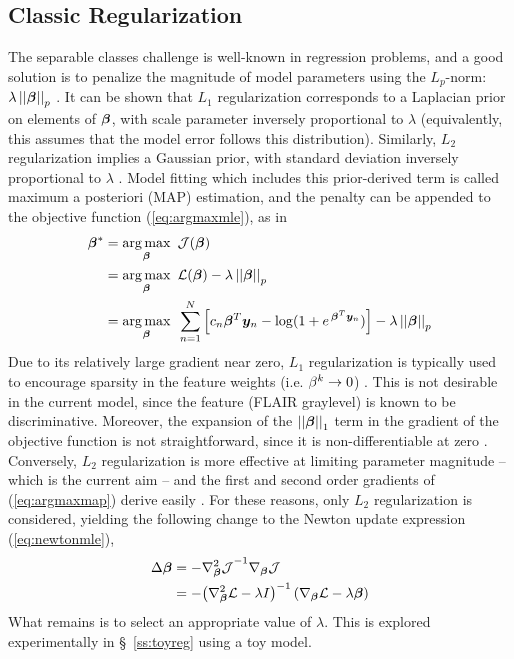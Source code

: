 \subsection{Classic Regularization}\label{ss:meth-lambda}
The separable classes challenge is well-known in regression problems, and a good solution is to penalize the magnitude of model parameters using the $L_p$-norm: $\lambda\left|\left|\bm{\beta}\right|\right|_p$ \cite{Zou2005}.
It can be shown that $L_1$ regularization corresponds to a Laplacian prior on elements of $\bm{\beta}$, with scale parameter inversely proportional to $\lambda$ (equivalently, this assumes that the model error follows this distribution).
Similarly, $L_2$ regularization implies a Gaussian prior, with standard deviation inversely proportional to $\lambda$ \cite{Zou2005}.
Model fitting which includes this prior-derived term is called maximum a posteriori (MAP) estimation, and the penalty can be appended to the objective function (\ref{eq:argmaxmle}), as in
\begin{align}
\bm{\beta}^* &= \underset{\bm{\beta}}{\arg\max}\enspace\mathcal{J}(\bm{\beta}) \nonumber\\
&=\underset{\bm{\beta}}{\arg\max}\enspace\mathcal{L}(\bm{\beta}) - \lambda\left|\left|\bm{\beta}\right|\right|_p \nonumber\\
&= \underset{\bm{\beta}}{\arg\max}\enspace\sum_{n=1}^{N} \Big[ c_n \bm{\beta}^T\bm{y}_n - \log (1+e^{\thinspace\bm{\beta}^T\bm{y}_n}) \Big] - \lambda\left|\left|\bm{\beta}\right|\right|_p
\label{eq:argmaxmap}
\end{align}
Due to its relatively large gradient near zero, $L_1$ regularization is typically used to encourage sparsity in the feature weights (i.e. $\beta^k\rightarrow0$) \cite{Tibshirani1996}.
This is not desirable in the current model, since the feature (FLAIR graylevel) is known to be discriminative.
Moreover, the expansion of the $\left|\left|\bm{\beta}\right|\right|_1$ term in the gradient of the objective function is not straightforward, since it is non-differentiable at zero \cite{Tibshirani1996,Lee2006}.
Conversely, $L_2$ regularization is more effective at limiting parameter magnitude -- which is the current aim -- and the first and second order gradients of (\ref{eq:argmaxmap}) derive easily \cite{Minka2003}.
For these reasons, only $L_2$ regularization is considered, yielding the following change to the Newton update expression (\ref{eq:newtonmle}),
\begin{align}
\Delta\bm{\beta} &= -{\nabla^2_{\bm{\beta}}\mathcal{J}}^{-1}\nabla_{\bm{\beta}}\mathcal{J} \nonumber\\
&= -{\left(\nabla^2_{\bm{\beta}}\mathcal{L}-\lambda I\right)}^{-1}\left(\nabla_{\bm{\beta}}\mathcal{L}-\lambda\bm{\beta}\right)
\label{eq:newtonmap}
\end{align}
What remains is to select an appropriate value of $\lambda$.
This is explored experimentally in \S\ \ref{ss:toyreg} using a toy model.

